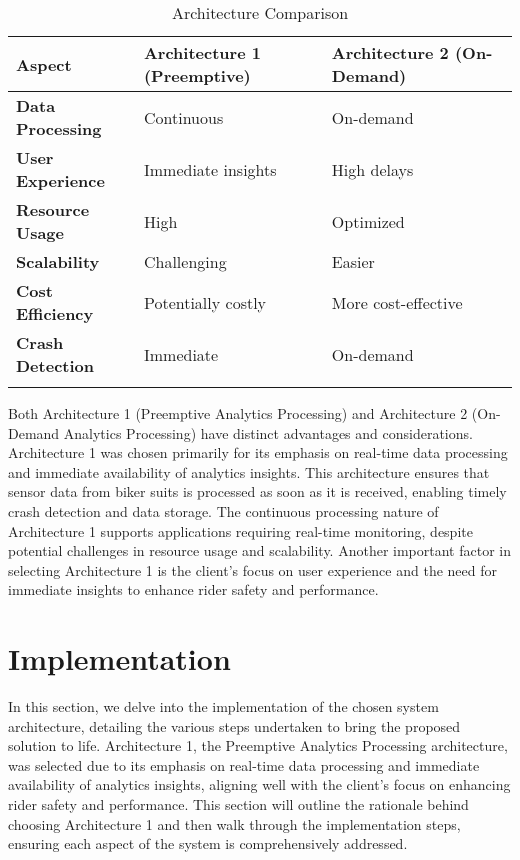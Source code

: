 \begin{longtable}{|p{3cm}|p{5cm}|p{5cm}|}
\hline
\textbf{Aspect} & \textbf{Architecture 1 (Preemptive)} & \textbf{Architecture 2 (On-Demand)} \\
\hline
\textbf{Data Processing} & Continuous & On-demand \\
\hline
\textbf{User Experience} & Immediate insights & High delays \\
\hline
\textbf{Resource Usage} & High & Optimized \\
\hline
\textbf{Scalability} & Challenging & Easier \\
\hline
\textbf{Cost Efficiency} & Potentially costly & More cost-effective \\
\hline
\textbf{Crash Detection} & Immediate & On-demand \\
\hline
\caption{Architecture Comparison}
\label{table:architecture_comparison}
\end{longtable}
Both Architecture 1 (Preemptive Analytics Processing) and Architecture 2 (On-Demand Analytics Processing) have distinct advantages and considerations. Architecture 1 was chosen primarily for its emphasis on real-time data processing and immediate availability of analytics insights. This architecture ensures that sensor data from biker suits is processed as soon as it is received, enabling timely crash detection and data storage. The continuous processing nature of Architecture 1 supports applications requiring real-time monitoring, despite potential challenges in resource usage and scalability. Another important factor in selecting Architecture 1 is the client's focus on user experience and the need for immediate insights to enhance rider safety and performance.


\section{Implementation}
\label{sec:implementation}

In this section, we delve into the implementation of the chosen system architecture, detailing the various steps undertaken to bring the proposed solution to life. Architecture 1, the Preemptive Analytics Processing architecture, was selected due to its emphasis on real-time data processing and immediate availability of analytics insights, aligning well with the client's focus on enhancing rider safety and performance. This section will outline the rationale behind choosing Architecture 1 and then walk through the implementation steps, ensuring each aspect of the system is comprehensively addressed.

